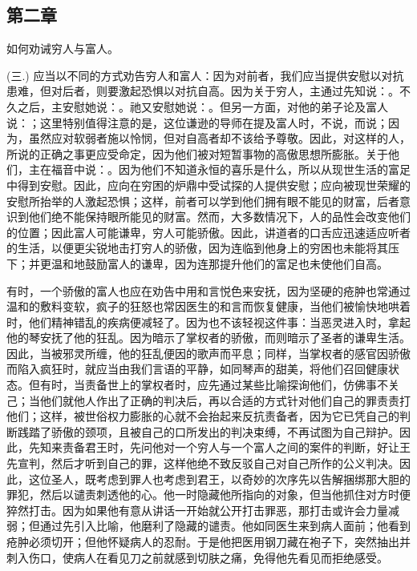 \subsection{第二章}

如何劝诫穷人与富人。\par

(三.) 应当以不同的方式劝告穷人和富人：因为对前者，我们应当提供安慰以对抗患难，但对后者，则要激起恐惧以对抗自高。因为关于穷人，主通过先知说：。不久之后，主安慰她说：。祂又安慰她说：。但另一方面，对他的弟子论及富人说：；这里特别值得注意的是，这位谦逊的导师在提及富人时，不说，而说；因为，虽然应对软弱者施以怜悯，但对自高者却不该给予尊敬。因此，对这样的人，所说的正确之事更应受命定，因为他们被对短暂事物的高傲思想所膨胀。关于他们，主在福音中说：。因为他们不知道永恒的喜乐是什么，所以从现世生活的富足中得到安慰。因此，应向在穷困的炉鼎中受试探的人提供安慰；应向被现世荣耀的安慰所抬举的人激起恐惧；这样，前者可以学到他们拥有眼不能见的财富，后者意识到他们绝不能保持眼所能见的财富。然而，大多数情况下，人的品性会改变他们的位置；因此富人可能谦卑，穷人可能骄傲。因此，讲道者的口舌应迅速适应听者的生活，以便更尖锐地击打穷人的骄傲，因为连临到他身上的穷困也未能将其压下；并更温和地鼓励富人的谦卑，因为连那提升他们的富足也未使他们自高。\par

有时，一个骄傲的富人也应在劝告中用和言悦色来安抚，因为坚硬的疮肿也常通过温和的敷料变软，疯子的狂怒也常因医生的和言而恢复健康，当他们被愉快地哄着时，他们精神错乱的疾病便减轻了。因为也不该轻视这件事：当恶灵进入时，拿起他的琴安抚了他的狂乱。因为暗示了掌权者的骄傲，而则暗示了圣者的谦卑生活。因此，当被邪灵所缠，他的狂乱便因的歌声而平息；同样，当掌权者的感官因骄傲而陷入疯狂时，就应当由我们言语的平静，如同琴声的甜美，将他们召回健康状态。但有时，当责备世上的掌权者时，应先通过某些比喻探询他们，仿佛事不关己；当他们就他人作出了正确的判决后，再以合适的方式针对他们自己的罪责责打他们；这样，被世俗权力膨胀的心就不会抬起来反抗责备者，因为它已凭自己的判断践踏了骄傲的颈项，且被自己的口所发出的判决束缚，不再试图为自己辩护。因此，先知来责备君王时，先问他对一个穷人与一个富人之间的案件的判断，好让王先宣判，然后才听到自己的罪，这样他绝不致反驳自己对自己所作的公义判决。因此，这位圣人，既考虑到罪人也考虑到君王，以奇妙的次序先以告解捆绑那大胆的罪犯，然后以谴责刺透他的心。他一时隐藏他所指向的对象，但当他抓住对方时便猝然打击。因为如果他有意从讲话一开始就公开打击罪恶，那打击或许会力量减弱；但通过先引入比喻，他磨利了隐藏的谴责。他如同医生来到病人面前；他看到疮肿必须切开；但他怀疑病人的忍耐。于是他把医用钢刀藏在袍子下，突然抽出并刺入伤口，使病人在看见刀之前就感到切肤之痛，免得他先看见而拒绝感受。\par

